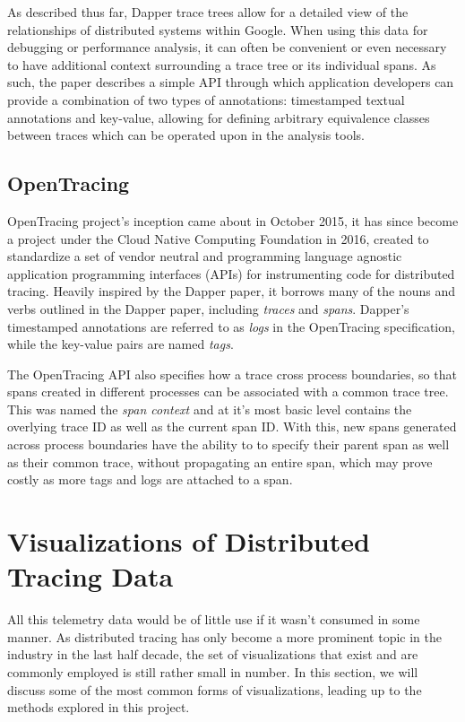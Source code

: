 \documentclass[pdftex,titlepage]{article}
\begin{document}
        As described thus far, Dapper trace trees allow for a detailed view of the relationships of distributed systems within
        Google. When using this data for debugging or performance analysis, it can often be convenient or even necessary to 
        have additional context surrounding a trace tree or its individual spans. As such, the paper describes a simple API 
        through which application developers can provide a combination of two types of annotations: timestamped textual annotations
        and key-value, allowing for defining arbitrary equivalence classes between traces which can be operated upon in the analysis
        tools.

        \subsection{OpenTracing}
        OpenTracing\cite{opentracing} project's inception came about in October 2015, it has since become a project under the 
        Cloud Native Computing Foundation in 2016, created to standardize a set of vendor neutral and programming language agnostic
        application programming interfaces (APIs) for instrumenting code for distributed tracing. Heavily inspired by the Dapper
        paper, it borrows many of the nouns and verbs outlined in the Dapper paper, including \textit{traces} and \textit{spans}.
        Dapper's timestamped annotations are referred to as \textit{logs} in the OpenTracing specification, while the key-value pairs
        are named \textit{tags}. 

        The OpenTracing API also specifies how a trace cross process boundaries, so that spans created in different processes can be
        associated with a common trace tree. This was named the \textit{span context} and at it's most basic level contains the 
        overlying trace ID as well as the current span ID. With this, new spans generated across process boundaries have the ability to
        to specify their parent span as well as their common trace, without propagating an entire span, which may prove costly as more
        tags and logs are attached to a span.
        
    \section{Visualizations of Distributed Tracing Data}
    All this telemetry data would be of little use if it wasn't consumed in some manner. As distributed tracing has only become a more
    prominent topic in the industry in the last half decade, the set of visualizations that exist and are commonly employed is still rather
    small in number. In this section, we will discuss some of the most common forms of visualizations, leading up to the methods explored 
    in this project.
    
\end{document}
